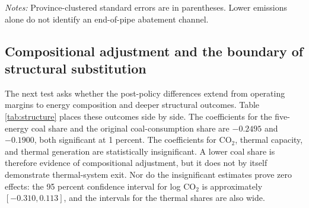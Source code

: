 \documentclass[11pt]{article}
\newcommand{\note}[1]{\begin{minipage}{0.96\textwidth}\footnotesize\textit{Notes:} #1\end{minipage}}
\begin{document}
\begin{table}[H]
\centering
\caption{Post-policy coal exposure and pollutant-emission responses}
\label{tab:pollution}
\note{Province-clustered standard errors are in parentheses. Lower emissions alone do not identify an end-of-pipe abatement channel.}
\end{table}

\subsection{Compositional adjustment and the boundary of structural substitution}

The next test asks whether the post-policy differences extend from operating margins to energy composition and deeper structural outcomes. Table \ref{tab:structure} places these outcomes side by side. The coefficients for the five-energy coal share and the original coal-consumption share are $-0.2495$ and $-0.1900$, both significant at 1 percent. The coefficients for CO$_2$, thermal capacity, and thermal generation are statistically insignificant. A lower coal share is therefore evidence of compositional adjustment, but it does not by itself demonstrate thermal-system exit. Nor do the insignificant estimates prove zero effects: the 95 percent confidence interval for log CO$_2$ is approximately $[-0.310,0.113]$, and the intervals for the thermal shares are also wide.
\end{document}
